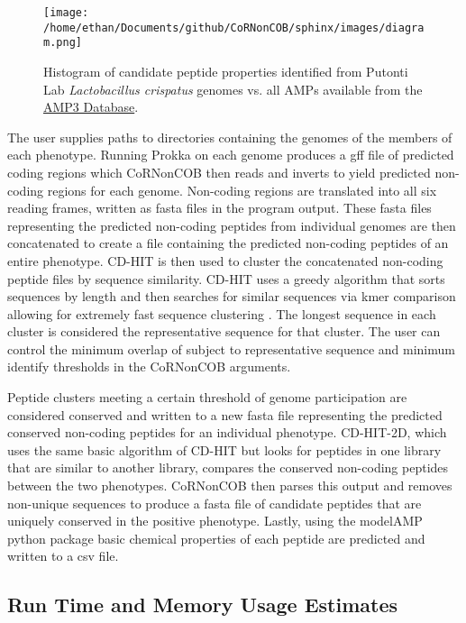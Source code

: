 \documentclass{article}
\begin{document}
\begin{figure}[h]
\centering
\texttt{[image: /home/ethan/Documents/github/CoRNonCOB/sphinx/images/diagram.png]}
\caption{Histogram of candidate peptide properties identified from Putonti Lab \emph{Lactobacillus crispatus} genomes vs. all AMPs available from the \href{http://aps.unmc.edu/AP/main.php}{AMP3 Database}.}
\label{fig:flow}
\end{figure}
The user supplies paths to directories containing the genomes of the members of each phenotype. Running Prokka on each genome produces a gff file of predicted coding regions which CoRNonCOB then reads and inverts to yield predicted non-coding regions for each genome. Non-coding regions are translated into all six reading frames, written as fasta files in the program output. These fasta files representing the predicted non-coding peptides from individual genomes are then concatenated to create a file containing the predicted non-coding peptides of an entire phenotype. CD-HIT is then used to cluster the concatenated non-coding peptide files by sequence similarity. CD-HIT uses a greedy algorithm that sorts sequences by length and then searches for similar sequences via kmer comparison allowing for extremely fast sequence clustering \cite{10.1093/bioinformatics/btl158}. The longest sequence in each cluster is considered the representative sequence for that cluster. The user can control the minimum overlap of subject to representative sequence and minimum identify thresholds in the CoRNonCOB arguments. 


Peptide clusters meeting a certain threshold of genome participation are considered conserved and written to a new fasta file representing the predicted conserved non-coding peptides for an individual phenotype. CD-HIT-2D, which uses the same basic algorithm of CD-HIT but looks for peptides in one library that are similar to another library, compares the conserved non-coding peptides between the two phenotypes. CoRNonCOB then parses this output and removes non-unique sequences to produce a fasta file of candidate peptides that are uniquely conserved in the positive phenotype. Lastly, using the modelAMP python package basic chemical properties of each peptide are predicted and written to a csv file.

\subsection{Run Time and Memory Usage Estimates}
\end{document}
